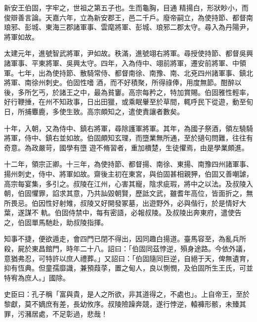 \begin{pinyinscope}
 新安王伯固，字牢之，世祖之第五子也。生而龜胸，目通
 精揚白，形狀眇小，而俊辯善言論。天嘉六年，立為新安郡王，邑二千戶。廢帝嗣立，為使持節、都督南琅邪、彭城、東海三郡諸軍事、雲麾將軍、彭城、琅邪二郡太守。尋入為丹陽尹，將軍如故。



 太建元年，進號智武將軍，尹如故。秩滿，進號翊右將軍。尋授使持節、都督吳興諸軍事、平東將軍、吳興太守。四年，入為侍中、翊前將軍，遷安前將軍、中領軍。七年，出為使持節、散騎常侍、都督南徐、南豫、南、北兗四州諸軍事、鎮北將軍、南徐州刺史。伯固性嗜
 酒，而不好積聚，所得祿俸，用度無節。酣醉以後，多所乞丐，於諸王之中，最為貧窶。高宗每矜之，特加賞賜。伯固雅性輕率，好行鞭捶，在州不知政事，日出田獵，或乘眠轝至於草間，輒呼民下從遊，動至旬日，所捕麞鹿，多使生致。高宗頗知之，遣使責讓者數矣。



 十年，入朝，又為侍中、鎮右將軍，尋除護軍將軍。其年，為國子祭酒，領左驍騎將軍，侍中、鎮右並如故。伯固頗知玄理，而墮業無所通，至於擿句問難，往往有奇意。為政嚴苛，國學有墮
 遊不脩習者，重加檟楚，生徒懼焉，由是學業頗進。



 十二年，領宗正卿。十三年，為使持節、都督揚、南徐、東揚、南豫四州諸軍事、揚州刺史，侍中、將軍如故。齋後主初在東宮，與伯固甚相親狎，伯固又善嘲謔，高宗每宴集，多引之。叔陵在江州，心害其寵，陰求疵瑕，將中之以法。及叔陵入朝，伯固懼罪，諂求其意，乃共訕毀朝賢，歷詆文武，雖耆年高位，皆面折之，無所畏忌。伯因性好射雉，叔陵又好開發冢墓，出遊野外，必與偕行，於是情好大葉，遂謀不
 軌。伯固侍禁中，每有密語，必報叔陵。及叔陵出奔東府，遣使告之，伯固單馬馳赴，助叔陵指揮。



 知事不捷，便欲遁走，會四門已閉不得出，因同趣白揚道。臺馬容至，為亂兵所殺，屍於東昌館門，時年二十八。詔曰：「伯固同茲悖逆，殞身途路。今依外議，意猶弗忍，可特許以庶人禮葬。」又詔曰：「伯固隨同巨逆，自絕于天，俾無遺育，抑有恆典。但童孺靡識，兼預葭莩，置之甸人，良以惻憫，及伯固所生王氏，可並特宥為庶人。」國除。



 史臣曰：孔子稱「富與貴，是人之所欲，非其道得之，不處也」。上自帝王，至於黎獻，莫不嫡庶有差，長幼攸序。叔陵險躁奔競，遂行悖逆，轅褲形骸，未臻其罪，污瀦居處，不足彰過，悲哉！



\end{pinyinscope}